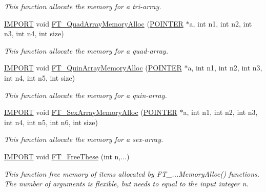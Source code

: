 \begin{DoxyCompactItemize}
\begin{DoxyCompactList}\small\item\em This function allocate the memory for a tri-\/array. \end{DoxyCompactList}\item 
\hyperlink{cdecs_8h_a773175d74e73776d69c3e538f17de1ee}{I\+M\+P\+O\+RT} void \hyperlink{group___m_e_m_o_r_y_gacae5a3f530c605b817da658e8125d349}{F\+T\+\_\+\+Quad\+Array\+Memory\+Alloc} (\hyperlink{cdecs_8h_ae51a81000f343b8ec43bca1f6a723d7b}{P\+O\+I\+N\+T\+ER} $\ast$a, int n1, int n2, int n3, int n4, int size)
\begin{DoxyCompactList}\small\item\em This function allocate the memory for a quad-\/array. \end{DoxyCompactList}\item 
\hyperlink{cdecs_8h_a773175d74e73776d69c3e538f17de1ee}{I\+M\+P\+O\+RT} void \hyperlink{group___m_e_m_o_r_y_ga7d1eb9f91240b404f71aa5330a10db67}{F\+T\+\_\+\+Quin\+Array\+Memory\+Alloc} (\hyperlink{cdecs_8h_ae51a81000f343b8ec43bca1f6a723d7b}{P\+O\+I\+N\+T\+ER} $\ast$a, int n1, int n2, int n3, int n4, int n5, int size)
\begin{DoxyCompactList}\small\item\em This function allocate the memory for a quin-\/array. \end{DoxyCompactList}\item 
\hyperlink{cdecs_8h_a773175d74e73776d69c3e538f17de1ee}{I\+M\+P\+O\+RT} void \hyperlink{group___m_e_m_o_r_y_gaead680b732b97af8f9f87f68ce6a5a12}{F\+T\+\_\+\+Sex\+Array\+Memory\+Alloc} (\hyperlink{cdecs_8h_ae51a81000f343b8ec43bca1f6a723d7b}{P\+O\+I\+N\+T\+ER} $\ast$a, int n1, int n2, int n3, int n4, int n5, int n6, int size)
\begin{DoxyCompactList}\small\item\em This function allocate the memory for a sex-\/array. \end{DoxyCompactList}\item 
\hyperlink{cdecs_8h_a773175d74e73776d69c3e538f17de1ee}{I\+M\+P\+O\+RT} void \hyperlink{group___m_e_m_o_r_y_ga66158bee772523da70a72319d21ce78b}{F\+T\+\_\+\+Free\+These} (int n,...)
\begin{DoxyCompactList}\small\item\em This function free memory of items allocated by F\+T\+\_\+...Memory\+Alloc() functions. The number of arguments is flexible, but needs to equal to the input integer n. \end{DoxyCompactList}\end{DoxyCompactItemize}


